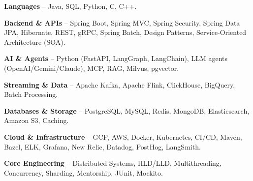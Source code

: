 \begin{zitemize}
\item \textbf{Languages} -- Java, SQL, Python, C, C++.
\item \textbf{Backend \& APIs} -- Spring Boot, Spring MVC, Spring Security, Spring Data JPA, Hibernate, REST, gRPC, Spring Batch, Design Patterns, Service-Oriented Architecture (SOA).
\item \textbf{AI \& Agents} -- Python (FastAPI, LangGraph, LangChain), LLM agents (OpenAI/Gemini/Claude), MCP, RAG, Milvus, pgvector.
\item \textbf{Streaming \& Data} -- Apache Kafka, Apache Flink, ClickHouse, BigQuery, Batch Processing.
\item \textbf{Databases \& Storage} -- PostgreSQL, MySQL, Redis, MongoDB, Elasticsearch, Amazon S3, Caching.
\item \textbf{Cloud \& Infrastructure} -- GCP, AWS, Docker, Kubernetes, CI/CD, Maven, Bazel, ELK, Grafana, New Relic, Datadog, PostHog, LangSmith.
\item \textbf{Core Engineering} -- Distributed Systems, HLD/LLD, Multithreading, Concurrency, Sharding, Mentorship, JUnit, Mockito.
\end{zitemize}
